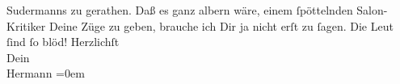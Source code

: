 \begin{ledgroupsized}[t]{13cm}
                  Sudermanns zu gerathen. Daß es ganz albern
               wäre, einem ſpöttelnden Salon-Kritiker Deine Züge zu geben, brauche ich Dir ja nicht
               erſt zu ſagen. Die Leut ſind ſo blöd!\pend
           \pstart
           Herzlichſt{\\[\baselineskip]}Dein{\\[\baselineskip]}\spacefill\mbox{Hermann}\pend
           \leftskip=0em{}
         
         \endnumbering{}\end{ledgroupsized}  \newcommand{\dateiname}{L01242}\newcommand{\titel}{Hermann Bahr an Arthur Schnitzler, 15. 10. 1902}\newcommand{\editorInnen}{ Kurt Ifkovits,  Martin Anton Müller}
      
